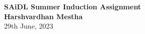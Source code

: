 \begin{titlepage}
    \begin{center}
    {\fontsize{40}{48}\selectfont \bfseries SAiDL Summer Induction Assignment} 
    \\\vspace{20pt}
    \vspace{20pt}
    \textbf{Harshvardhan Mestha}
    \vspace{8pt}
    \\ 29th June, 2023
    \end{center}
\end{titlepage}
